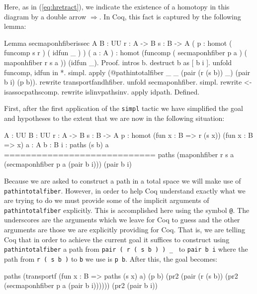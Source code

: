 Here, as in (\ref{eq:hretract}), we indicate the existence of a
homotopy in this diagram by a double arrow $\Rightarrow$.  In Coq,
this fact is captured by the following lemma:
\begin{center}
  \begin{coqcode}
Lemma secmaponhfiberissec {A B : UU} { r : A -> B } { s : B -> A } ( p : homot ( funcomp s r ) ( idfun _ ) ) ( a : A ) : homot (funcomp  ( secmaponhfiber p a ) ( maponhfiber r s a )) (idfun _).
Proof.
 intros b. destruct b as [ b i ]. unfold funcomp, idfun in *. simpl. 
 apply (@pathintotalfiber _ _ (pair (r (s b)) _) (pair b i) (p b)).
 rewrite transportfandhfiber. unfold secmaponhfiber. simpl.
 rewrite <- isassocpathscomp. rewrite islinvpathsinv. apply idpath. 
Defined.
  \end{coqcode}
\end{center}
First, after the first application of the \verb|simpl| tactic we
have simplified the goal and hypotheses to the extent that we are now
in the following situation:
\begin{center}
  \begin{coqcode}
  A : UU
  B : UU
  r : A -> B
  s : B -> A
  p : homot (fun x : B => r (s x)) (fun x : B => x)
  a : A
  b : B
  i : paths (s b) a
  ============================
   paths (maponhfiber r s a (secmaponhfiber p a (pair b i))) 
     (pair b i)
  \end{coqcode}
\end{center}
Because we are asked to construct a path in a total space we will make
use of \verb|pathintotalfiber|.  However, in order to help Coq
understand exactly what we are trying to do we must provide some of
the implicit arguments of \verb|pathintotalfiber| explicitly.
This is accomplished here using the symbol \verb|@|.  The
underscores are the arguments which we leave for Coq to guess and the
other arguments are those we are explicitly providing for Coq.  That
is, we are telling Coq that in order to achieve the current goal it
suffices to construct using \verb|pathintotalfiber| a path from
\verb|pair ( r ( s b ) ) _ | to \verb|pair b i| where the
path from \verb|r ( s b )| to \verb|b| we use is 
\verb|p b|.  After this, the goal becomes:
\begin{center}
  \begin{coqcode}
paths
 (transportf (fun x : B => paths (s x) a) (p b)
   (pr2 (pair (r (s b)) (pr2 (secmaponhfiber p a (pair b i))))))
 (pr2 (pair b i))
  \end{coqcode}
\end{center}
